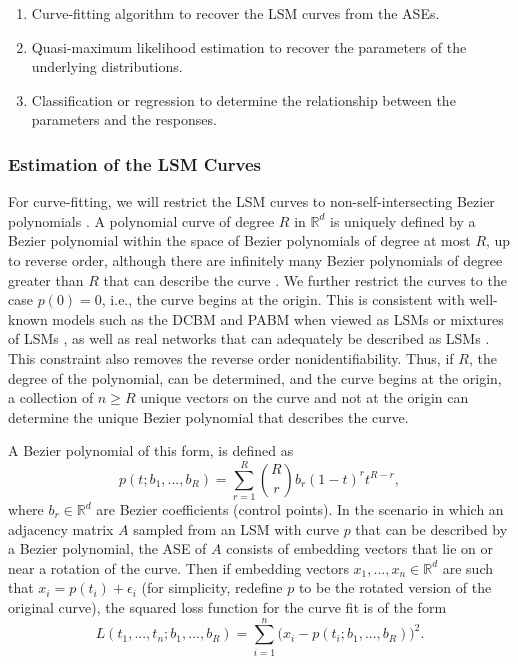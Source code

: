 \documentclass[12pt]{article}
\providecommand{\tightlist}{%
  \setlength{\itemsep}{0pt}\setlength{\parskip}{0pt}}
\begin{document}
\begin{enumerate}
\def\labelenumi{\arabic{enumi}.}
\tightlist
\item
  Curve-fitting algorithm to recover the LSM curves from the ASEs.
\item
  Quasi-maximum likelihood estimation to recover the parameters of the
  underlying distributions.
\item
  Classification or regression to determine the relationship between the
  parameters and the responses.
\end{enumerate}

\hypertarget{estimation-of-the-lsm-curves}{%
\subsubsection{Estimation of the LSM
Curves}\label{estimation-of-the-lsm-curves}}

For curve-fitting, we will restrict the LSM curves to
non-self-intersecting Bezier polynomials \citep{10.5555/320367}. A
polynomial curve of degree \(R\) in \(\mathbb{R}^d\) is uniquely defined
by a Bezier polynomial within the space of Bezier polynomials of degree
at most \(R\), up to reverse order, although there are infinitely many
Bezier polynomials of degree greater than \(R\) that can describe the
curve \citep{SANCHEZREYES2022102118}. We further restrict the curves to
the case \(p(0) = 0\), i.e., the curve begins at the origin. This is
consistent with well-known models such as the DCBM and PABM when viewed
as LSMs or mixtures of LSMs
\citep{Koo_2022, rubindelanchy2017statistical}, as well as real networks
that can adequately be described as LSMs \citep{athreya2020estimation}.
This constraint also removes the reverse order nonidentifiability. Thus,
if \(R\), the degree of the polynomial, can be determined, and the curve
begins at the origin, a collection of \(n \geq R\) unique vectors on the
curve and not at the origin can determine the unique Bezier polynomial
that describes the curve.

A Bezier polynomial of this form, is defined as \begin{equation}
\label{eq:bezier}
p(t; b_1, ..., b_R) = \sum_{r=1}^R \binom{R}{r} b_r (1-t)^r t^{R-r},
\end{equation} where \(b_r \in \mathbb{R}^d\) are Bezier coefficients
(control points). In the scenario in which an adjacency matrix \(A\)
sampled from an LSM with curve \(p\) that can be described by a Bezier
polynomial, the ASE of \(A\) consists of embedding vectors that lie on
or near a rotation of the curve. Then if embedding vectors
\(x_1, ..., x_n \in \mathbb{R}^d\) are such that
\(x_i = p(t_i) + \epsilon_i\) (for simplicity, redefine \(p\) to be the
rotated version of the original curve), the squared loss function for
the curve fit is of the form \begin{equation}
\label{eq:bezier-loss-full}
L(t_1, ..., t_n; b_1, ..., b_R) = \sum_{i=1}^n \big( x_i - p(t_i; b_1, ..., b_R) \big)^2.
\end{equation}
\end{document}
